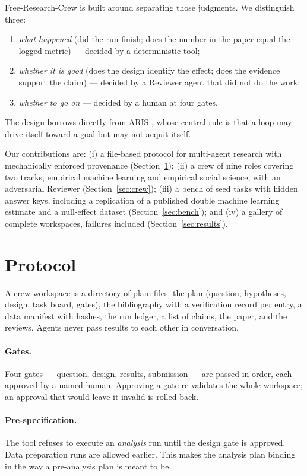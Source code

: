 \documentclass[11pt]{article}
\begin{document}
Free-Research-Crew is built around separating those judgments. We distinguish three:
\begin{enumerate}[nosep]
  \item \emph{what happened} (did the run finish; does the number in the paper equal the
        logged metric) --- decided by a deterministic tool;
  \item \emph{whether it is good} (does the design identify the effect; does the evidence
        support the claim) --- decided by a Reviewer agent that did not do the work;
  \item \emph{whether to go on} --- decided by a human at four gates.
\end{enumerate}
The design borrows directly from ARIS \citep{aris}, whose central rule is that a loop
may drive itself toward a goal but may not acquit itself.

Our contributions are: (i) a file-based protocol for multi-agent research with
mechanically enforced provenance (Section~\ref{sec:protocol}); (ii) a crew of nine roles
covering two tracks, empirical machine learning and empirical social science, with an
adversarial Reviewer (Section~\ref{sec:crew}); (iii) a bench of seed tasks with hidden
answer keys, including a replication of a published double machine learning estimate
and a null-effect dataset (Section~\ref{sec:bench}); and (iv) a gallery of complete
workspaces, failures included (Section~\ref{sec:results}).

\section{Protocol}\label{sec:protocol}

A crew workspace is a directory of plain files: the plan (question, hypotheses, design,
task board, gates), the bibliography with a verification record per entry, a data
manifest with hashes, the run ledger, a list of claims, the paper, and the reviews.
Agents never pass results to each other in conversation.

\paragraph{Gates.} Four gates --- question, design, results, submission --- are passed in
order, each approved by a named human. Approving a gate re-validates the whole
workspace; an approval that would leave it invalid is rolled back.

\paragraph{Pre-specification.} The tool refuses to execute an \emph{analysis} run until
the design gate is approved. Data preparation runs are allowed earlier. This makes the
analysis plan binding in the way a pre-analysis plan is meant to be.
\end{document}
